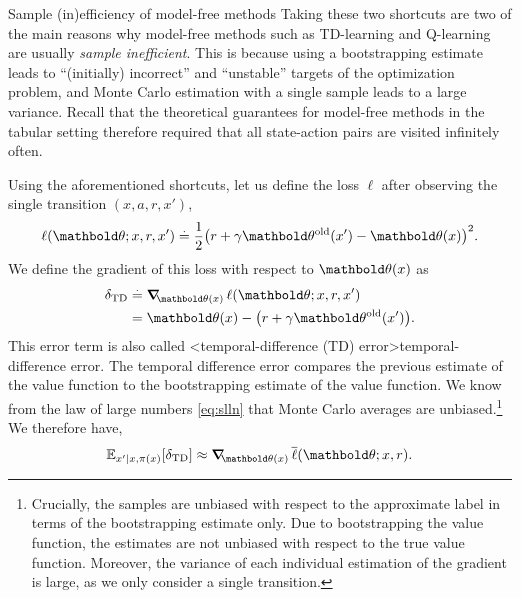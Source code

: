 \begin{rmk}{Sample (in)efficiency of model-free methods}{}
  Taking these two shortcuts are two of the main reasons why model-free methods such as TD-learning and Q-learning are usually \emph{sample inefficient}.
  This is because using a bootstrapping estimate leads to ``(initially) incorrect'' and ``unstable'' targets of the optimization problem, and Monte Carlo estimation with a single sample leads to a large variance.
  Recall that the theoretical guarantees for model-free methods in the tabular setting therefore required that all state-action pairs are visited infinitely often.
\end{rmk}

Using the aforementioned shortcuts, let us define the loss $\ell$ after observing the single transition $(x, a, r, x')$, \begin{align}
  \ell(\vtheta; x, r, x') \defeq \frac{1}{2}\parentheses*{r + \gamma \old{\vtheta}(x') - \vtheta(x)}^2.
\end{align}
We define the gradient of this loss with respect to $\vtheta(x)$ as \begin{align}
  \delta_\mathrm{TD} &\defeq \grad_{\vtheta(x)} \ell(\vtheta; x, r, x') \nonumber \\
  &= \vtheta(x) - \parentheses*{r + \gamma \old{\vtheta}(x')}. \label{eq:td_error}
\end{align}
This error term is also called \midx<temporal-difference (TD) error>{temporal-difference error}.
The temporal difference error compares the previous estimate of the value function to the bootstrapping estimate of the value function.
We know from the law of large numbers \eqref{eq:slln} that Monte Carlo averages are unbiased.\footnote{Crucially, the samples are unbiased with respect to the approximate label in terms of the bootstrapping estimate only.
Due to bootstrapping the value function, the estimates are not unbiased with respect to the true value function.
Moreover, the variance of each individual estimation of the gradient is large, as we only consider a single transition.}
We therefore have, \begin{align}
  \E[x' \mid x, \pi(x)]{\delta_\mathrm{TD}} \approx \grad_{\vtheta(x)} \mean{\ell}(\vtheta; x, r). \label{eq:td_error_approx}
\end{align}

